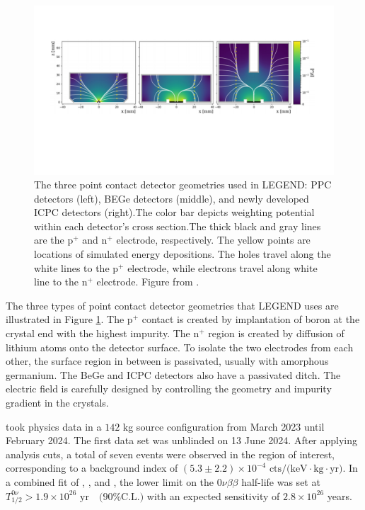 \begin{figure}[!htb]
  \includegraphics[trim=16 30 16 20,clip,width=\linewidth]{ch2/figs/Det-geo-2.pdf}
\caption{The three point contact detector geometries used in LEGEND: {\MJD} PPC detectors (left), {\Gerda} BEGe detectors (middle), and newly developed ICPC detectors (right).The color bar depicts weighting potential within each detector's cross section.The thick black and gray lines are the p$^+$ and n$^+$ electrode, respectively. The yellow points are locations of simulated energy depositions. The holes travel along the white lines to the p$^+$ electrode, while electrons travel along white line to the n$^+$ electrode. Figure from \cite{Comellato:2020ljj}.}
\label{fig:det-compare}
  \end{figure}
  
The three types of point contact detector geometries that LEGEND uses are illustrated in Figure \ref{fig:det-compare}. The p$^+$ contact is created by implantation of boron at the crystal end with the highest impurity. The n$^+$ region is created by diffusion of lithium atoms onto the detector surface. To isolate the two electrodes from each other, the surface region in between is passivated, usually with amorphous germanium. The BeGe and ICPC detectors also have a passivated ditch. The electric field is carefully designed by controlling the geometry and impurity gradient in the crystals. 


{\Ltwo} took physics data in a $142$ kg source configuration from March 2023 until February 2024. The first data set was unblinded on 13 June 2024. After applying analysis cuts, a total of seven events were observed in the region of interest, corresponding to a background index of $ (5.3 \pm 2.2) \times 10^{-4} \text{ cts/(keV$\cdot$kg$\cdot$yr)}$. In a combined fit of {\Gerda}, {\MJD}, and {\Ltwo}, the lower limit on the 0$\nu\beta\beta$ half-life was set at $T^{0\nu}_{1/2} > 1.9 \times 10^{26} \text{ yr} \quad \text{(90\% C.L.)}$ with an expected sensitivity of $2.8 \times 10^{26}$ years. \cite{Pertoldi2024}

